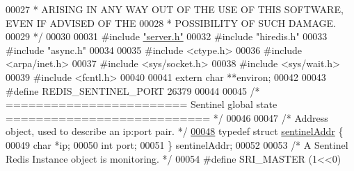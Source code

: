 \begin{DoxyCode}
00027 \textcolor{comment}{ * ARISING IN ANY WAY OUT OF THE USE OF THIS SOFTWARE, EVEN IF ADVISED OF THE}
00028 \textcolor{comment}{ * POSSIBILITY OF SUCH DAMAGE.}
00029 \textcolor{comment}{ */}
00030 
00031 \textcolor{preprocessor}{#}\textcolor{preprocessor}{include} \hyperlink{server_8h}{"server.h"}
00032 \textcolor{preprocessor}{#}\textcolor{preprocessor}{include} \textcolor{preprocessor}{"hiredis.h"}
00033 \textcolor{preprocessor}{#}\textcolor{preprocessor}{include} \textcolor{preprocessor}{"async.h"}
00034 
00035 \textcolor{preprocessor}{#}\textcolor{preprocessor}{include} \textcolor{preprocessor}{<}\textcolor{preprocessor}{ctype}\textcolor{preprocessor}{.}\textcolor{preprocessor}{h}\textcolor{preprocessor}{>}
00036 \textcolor{preprocessor}{#}\textcolor{preprocessor}{include} \textcolor{preprocessor}{<}\textcolor{preprocessor}{arpa}\textcolor{preprocessor}{/}\textcolor{preprocessor}{inet}\textcolor{preprocessor}{.}\textcolor{preprocessor}{h}\textcolor{preprocessor}{>}
00037 \textcolor{preprocessor}{#}\textcolor{preprocessor}{include} \textcolor{preprocessor}{<}\textcolor{preprocessor}{sys}\textcolor{preprocessor}{/}\textcolor{preprocessor}{socket}\textcolor{preprocessor}{.}\textcolor{preprocessor}{h}\textcolor{preprocessor}{>}
00038 \textcolor{preprocessor}{#}\textcolor{preprocessor}{include} \textcolor{preprocessor}{<}\textcolor{preprocessor}{sys}\textcolor{preprocessor}{/}\textcolor{preprocessor}{wait}\textcolor{preprocessor}{.}\textcolor{preprocessor}{h}\textcolor{preprocessor}{>}
00039 \textcolor{preprocessor}{#}\textcolor{preprocessor}{include} \textcolor{preprocessor}{<}\textcolor{preprocessor}{fcntl}\textcolor{preprocessor}{.}\textcolor{preprocessor}{h}\textcolor{preprocessor}{>}
00040 
00041 \textcolor{keyword}{extern} \textcolor{keywordtype}{char} **environ;
00042 
00043 \textcolor{preprocessor}{#}\textcolor{preprocessor}{define} \textcolor{preprocessor}{REDIS\_SENTINEL\_PORT} 26379
00044 
00045 \textcolor{comment}{/* ======================== Sentinel global state =========================== */}
00046 
00047 \textcolor{comment}{/* Address object, used to describe an ip:port pair. */}
\hyperlink{structsentinelAddr}{00048} \textcolor{keyword}{typedef} \textcolor{keyword}{struct} \hyperlink{structsentinelAddr}{sentinelAddr} \{
00049     \textcolor{keywordtype}{char} *ip;
00050     \textcolor{keywordtype}{int} port;
00051 \} sentinelAddr;
00052 
00053 \textcolor{comment}{/* A Sentinel Redis Instance object is monitoring. */}
00054 \textcolor{preprocessor}{#}\textcolor{preprocessor}{define} \textcolor{preprocessor}{SRI\_MASTER}  \textcolor{preprocessor}{(}1\textcolor{preprocessor}{<<}0\textcolor{preprocessor}{)}

\end{DoxyCode}
